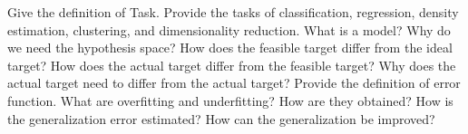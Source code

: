 \newpage
\begin{exercise}[topsep=20pt, itemsep=10pt]
    \ex Give the definition of Task. Provide the tasks of classification, regression, density estimation, clustering, and dimensionality reduction.
    \ex What is a model? Why do we need the hypothesis space?
    \ex How does the feasible target differ from the ideal target? How does the actual target differ from the feasible target? Why does the actual target need to differ from the actual target?
    \ex Provide the definition of error function.
    \ex What are overfitting and underfitting? How are they obtained?
    \ex How is the generalization error estimated?
    \ex How can the generalization be improved?
\end{exercise}
